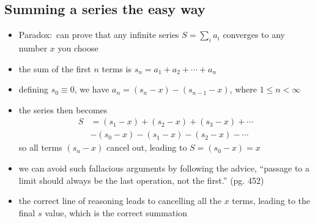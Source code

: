 \documentclass[../jaynes_prob_theory_notes.tex]{subfiles}
\begin{document}
        \subsection{Summing a series the easy way}
            \begin{itemize} 
                \item Paradox:\ can prove that any infinite series \(S = \sum_{i} a_i\) converges to any number \(x\) you choose
                \item the sum of the first \(n\) terms is \(s_n = a_1 + a_2 + \cdots + a_n\)
                \item defining \(s_0 \equiv 0\), we have \(a_n = (s_n - x) - (s_{n-1} - x)\), where \(1 \leq n < \infty\)
                \item the series then becomes
                    \begin{align*} 
                        S &= (s_1 - x) + (s_2 - x) + (s_3 - x) + \cdots \\
                          &- (s_0 - x) - (s_1 - x) - (s_2 - x) - \cdots
                    \end{align*}
                    so all terms \( (s_n - x) \) cancel out, leading to \(S = (s_0 - x) = x\)
                \item we can avoid such fallacious arguments by following the advice, ``passage to a limit should always be the last operation, not the first.'' (pg. 452)
                \item the correct line of reasoning leads to cancelling all the \(x\) terms, leading to the final \(s\) value, which is the correct summation
            \end{itemize}
\end{document}
